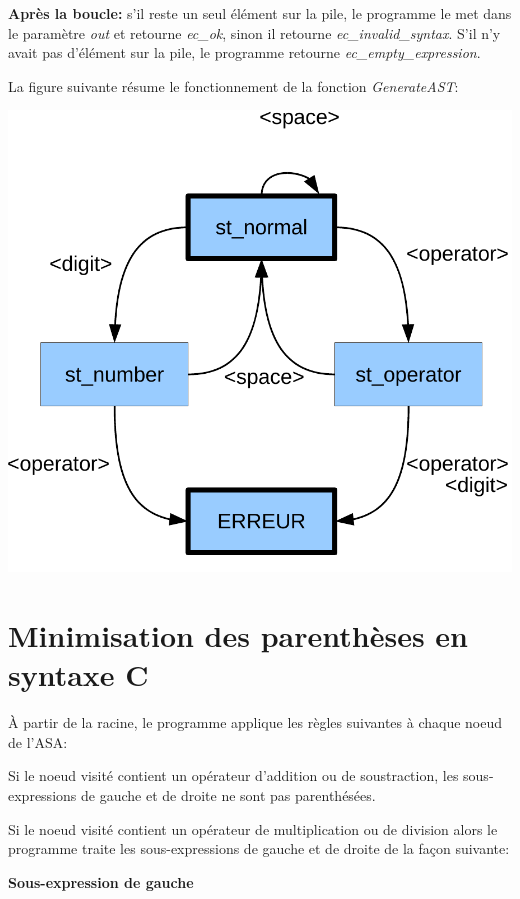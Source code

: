 \documentclass[10pt]{report}
\begin{document}
\textbf{Après la boucle:} s'il reste un seul élément sur la pile, le programme
le met dans le paramètre \emph{out} et retourne \emph{ec\_ok}, sinon il
retourne \emph{ec\_invalid\_syntax}.  S'il n'y avait pas d'élément sur la
pile, le programme retourne \emph{ec\_empty\_expression}.

La figure suivante résume le fonctionnement de la fonction \emph{GenerateAST}:

\begin{center}
  \includegraphics[scale=0.33]{statemachine}
\end{center}


\newpage

\section{Minimisation des parenthèses en syntaxe C}
À partir de la racine, le programme applique les règles suivantes à chaque noeud de
l'ASA:

Si le noeud visité contient un opérateur d'addition ou de soustraction,
les sous-expressions de gauche et de droite ne sont pas parenthésées.

Si le noeud visité contient un opérateur de multiplication ou de division
alors le programme traite les sous-expressions de gauche et de droite de la
façon suivante:

\textbf{Sous-expression de gauche}
\end{document}
